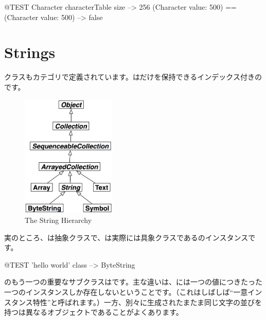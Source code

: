 \documentclass[a4paper,10pt,twoside]{book}
\begin{document}
\begin{code}{@TEST}
Character characterTable size                               --> 256
(Character value: 500) == (Character value: 500) --> false
\end{code}

\section{Strings}

クラスもカテゴリで定義されています。はだけを保持できるインデックス付きのです。

\begin{figure}[ht]
  {\centerline {\includegraphics[width=0.4\textwidth]{StringHierarchy}}}
\caption{The String Hierarchy }
\end{figure}

実のところ、は抽象クラスで、は実際には具象クラスであるのインスタンスです。

\begin{code}{@TEST}
'hello world' class --> ByteString
\end{code}

のもう一つの重要なサブクラスはです。主な違いは、には一つの値につきたった一つのインスタンスしか存在しないということです。（これはしばしば``一意インスタンス特性''と呼ばれます。）一方、別々に生成されたまたま同じ文字の並びを持つは異なるオブジェクトであることがよくあります。
\end{document}
